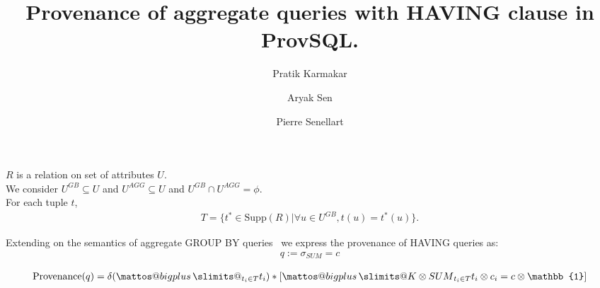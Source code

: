 \documentclass{article}
\title{Provenance of aggregate queries with HAVING clause in ProvSQL.}
\author{Pratik Karmakar \and Aryak Sen \and Pierre Senellart}
\date{}
\makeatletter
\newcommand{\bigplus}{%
  \DOTSB\mathop{\mathpalette\mattos@bigplus\relax}\slimits@
}
\newcommand\mattos@bigplus[2]{%
  \vcenter{\hbox{%
    \sbox\z@{$#1\sum$}%
    \resizebox{!}{0.9\dimexpr\ht\z@+\dp\z@}{\raisebox{\depth}{$\m@th#1+$}}%
  }}%
  \vphantom{\sum}%
}
\makeatother
\begin{document}
\maketitle

$R$ is a relation on set of attributes $U$.\\
We consider $U^{GB} \subseteq U$ and $U^{AGG}\subseteq U$ and $U^{GB}\cap U^{AGG} = \phi$.\\
For each tuple $t$, 
\begin{align*}
T = \{t^*\in \mathrm{Supp}(R)|\forall u\in U^{GB}, t(u) = t^*(u)\}.    
\end{align*}

Extending on the semantics of aggregate GROUP BY queries~\cite{amsterdamer2011provenance} we express the provenance of HAVING queries as: 
\begin{align*}
    q:= \sigma_{SUM} = c
\end{align*}

\begin{align*}
\mathrm{Provenance}(q) = \delta(\bigplus_{t_i \in T} t_i) * [\bigplus{K\otimes{SUM}}_{t_i\in T}t_i \otimes c_i = c\otimes \mathbb{1}]    
\end{align*}
\end{document}
